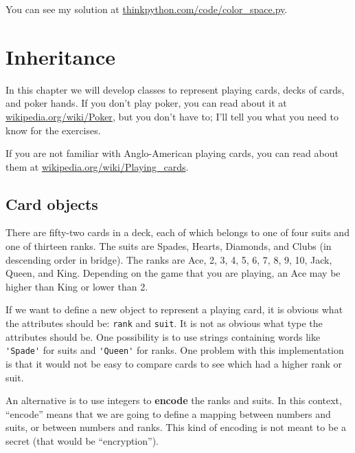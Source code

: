 \documentclass[10pt]{book}
\begin{document}
{\begin{ex}
\begin{enumerate}
\end{enumerate}

You can see my solution at \url{thinkpython.com/code/color_space.py}.

\end{ex}


\chapter{Inheritance}

In this chapter we will develop classes to represent playing cards,
decks of cards, and poker hands.  If you don't play poker, you can
read about it at \url{wikipedia.org/wiki/Poker}, but you don't have
to; I'll tell you what you need to know for the exercises.


If you are not familiar with Anglo-American playing cards,
you can read about them at \url{wikipedia.org/wiki/Playing_cards}.


\section{Card objects}

There are fifty-two cards in a deck, each of which belongs to one of
four suits and one of thirteen ranks.  The suits are Spades, Hearts,
Diamonds, and Clubs (in descending order in bridge).  The ranks are
Ace, 2, 3, 4, 5, 6, 7, 8, 9, 10, Jack, Queen, and King.  Depending on
the game that you are playing, an Ace may be higher than King
or lower than 2.


If we want to define a new object to represent a playing card, it is
obvious what the attributes should be: {\tt rank} and
{\tt suit}.  It is not as obvious what type the attributes
should be.  One possibility is to use strings containing words like
\verb"'Spade'" for suits and \verb"'Queen'" for ranks.  One problem with
this implementation is that it would not be easy to compare cards to
see which had a higher rank or suit.


An alternative is to use integers to {\bf encode} the ranks and suits.
In this context, ``encode'' means that we are going to define a mapping
between numbers and suits, or between numbers and ranks.  This
kind of encoding is not meant to be a secret (that
would be ``encryption'').

}
\end{document}

